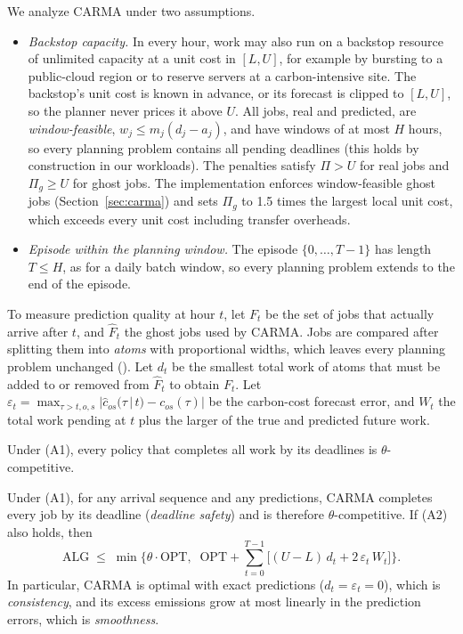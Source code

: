 We analyze CARMA under two assumptions.
\begin{itemize}
\item[(A1)] \emph{Backstop capacity.} In every hour, work may also run on a backstop resource of unlimited capacity at a unit cost in $[L,U]$, for example by bursting to a public-cloud region or to reserve servers at a carbon-intensive site. The backstop's unit cost is known in advance, or its forecast is clipped to $[L,U]$, so the planner never prices it above $U$. All jobs, real and predicted, are \emph{window-feasible}, $w_j\le m_j(d_j-a_j)$, and have windows of at most $H$ hours, so every planning problem contains all pending deadlines (this holds by construction in our workloads). The penalties satisfy $\Pi>U$ for real jobs and $\Pi_g\ge U$ for ghost jobs. The implementation enforces window-feasible ghost jobs (Section~\ref{sec:carma}) and sets $\Pi_g$ to 1.5 times the largest local unit cost, which exceeds every unit cost including transfer overheads.
\item[(A2)] \emph{Episode within the planning window.} The episode $\{0,\dots,T-1\}$ has length $T\le H$, as for a daily batch window, so every planning problem extends to the end of the episode.
\end{itemize}
To measure prediction quality at hour $t$, let $F_t$ be the set of jobs that actually arrive after $t$, and $\hat F_t$ the ghost jobs used by CARMA. Jobs are compared after splitting them into \emph{atoms} with proportional widths, which leaves every planning problem unchanged (). Let $d_t$ be the smallest total work of atoms that must be added to or removed from $\hat F_t$ to obtain $F_t$. Let $\varepsilon_t=\max_{\tau>t,o,s}|\hat c_{os}(\tau\,|\,t)-c_{os}(\tau)|$ be the carbon-cost forecast error, and $W_t$ the total work pending at $t$ plus the larger of the true and predicted future work.

\begin{proposition}\label{prop:robust}
Under (A1), every policy that completes all work by its deadlines is $\theta$-competitive.
\end{proposition}

\begin{theorem}\label{thm:carma}
Under (A1), for any arrival sequence and any predictions, CARMA completes every job by its deadline (\emph{deadline safety}) and is therefore $\theta$-competitive. If (A2) also holds, then
\begin{equation}\label{eq:smooth}
\mathrm{ALG}\;\le\;\min\Big\{\theta\cdot\mathrm{OPT},\;\;\mathrm{OPT}+\sum_{t=0}^{T-1}\big[(U-L)\,d_t+2\,\varepsilon_t\,W_t\big]\Big\}.
\end{equation}
In particular, CARMA is optimal with exact predictions ($d_t=\varepsilon_t=0$), which is \emph{consistency}, and its excess emissions grow at most linearly in the prediction errors, which is \emph{smoothness}.
\end{theorem}

